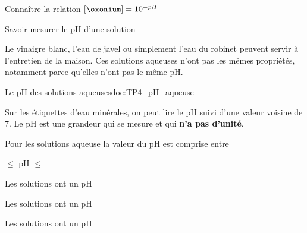 \tetePremStssChim

\vspace*{-36pt}

\begin{objectifs}
  \item Connaître la relation $[\oxonium] = 10^{-pH}$
  \item Savoir mesurer le pH d'une solution
\end{objectifs}


\begin{contexte}
  Le vinaigre blanc, l'eau de javel ou simplement l'eau du robinet peuvent servir à l'entretien de la maison.
  Ces solutions aqueuses n'ont pas les mêmes propriétés, notamment parce qu'elles n'ont pas le même pH.

\end{contexte}


\begin{doc}{Le pH des solutions aqueuses}{doc:TP4_pH_aqueuse}
  \begin{wrapfigure}[3]{r}{0.1\linewidth}
  \end{wrapfigure}
  
  Sur les étiquettes d'eau minérales, on peut lire le pH suivi d'une valeur voisine de 7.
  Le pH est une grandeur qui se mesure et qui \textbf{n'a pas d'unité}.
  
  \begin{encart}
    Pour les solutions aqueuse la valeur du pH est comprise entre
    \begin{center}
       $\leq$ pH $\leq$ 
    \end{center}
  \end{encart}

  \begin{encart}
    \begin{listePoints}
      \item Les solutions  ont un pH 
      \item Les solutions  ont un pH 
      \item Les solutions  ont un pH 
    \end{listePoints}
  \end{encart}
\end{doc}

